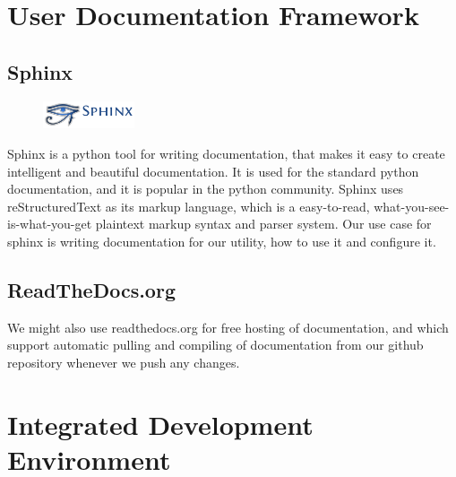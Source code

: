 \section{User Documentation Framework}
\label{sec:pre:docs}

\subsection{Sphinx}
\begin{figure}
	\begin{center}
	\vspace{-30pt}
		\includegraphics[width=2.7cm]{./planning/img/sphinx_logo}
	\vspace{-30pt}
	\end{center}
\end{figure}
Sphinx is a python tool for writing documentation, that makes it easy to create
intelligent and beautiful documentation. It is used for the standard python
documentation, and it is  popular in the python community. Sphinx uses
reStructuredText as its markup language, which is a easy-to-read,
what-you-see-is-what-you-get plaintext markup syntax and parser system. Our use
case for sphinx is writing documentation for our utility, how to use it and
configure it.

\subsection{ReadTheDocs.org}
We might also use readthedocs.org for free hosting of
documentation, and which support automatic pulling and compiling of
documentation from our github repository whenever we push any changes.

\section{Integrated Development Environment}
\label{sec:pre:ide}


